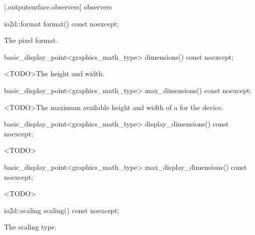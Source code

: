  [\iotwod.outputsurface.observers] { observers}

%
\begin{itemdecl}
io2d::format format() const noexcept;
\end{itemdecl}
\begin{itemdescr}
\pnum
\returns
The pixel format.
\end{itemdescr}

%
\begin{itemdecl}
basic_display_point<graphics_math_type> dimensions() const noexcept;
\end{itemdecl}
\begin{itemdescr}
\pnum
\returns
<TODO>The height and width.
\end{itemdescr}

%
\begin{itemdecl}
basic_display_point<graphics_math_type> max_dimensions() const noexcept;
\end{itemdecl}
\begin{itemdescr}
\pnum
\returns
<TODO>The maximum available height and width of a  for the device.
\end{itemdescr}

%
\begin{itemdecl}
basic_display_point<graphics_math_type> display_dimensions() const noexcept;
\end{itemdecl}
\begin{itemdescr}
\pnum
\returns
<TODO>
\end{itemdescr}

%
\begin{itemdecl}
basic_display_point<graphics_math_type> max_display_dimensions() const noexcept;
\end{itemdecl}
\begin{itemdescr}
\pnum
\returns
<TODO>
\end{itemdescr}

%
\begin{itemdecl}
io2d::scaling scaling() const noexcept;
\end{itemdecl}
\begin{itemdescr}
\pnum
\returns
The scaling type.
\end{itemdescr}

